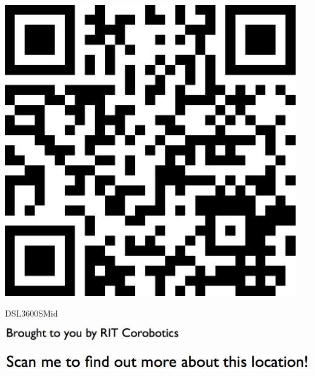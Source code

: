 \documentclass[letterpaper]{article}
\begin{document}
 \begingroup 
 \centerline{\includegraphics[scale=1,width=5in,height=5in]{DSL3600SMid.png}} 
 \endgroup 
 \vspace*{\fill} 

 \hfill{\small DSL3600SMid} 

  \vspace{0.7in} 
 
 \centerline{\includegraphics[scale=1,width=3in]{text-bottom.png}} 
 
 \pagebreak 
{} 
 \vspace*{\fill} 
 
  \centerline{\includegraphics[scale=1,width=6in]{text-top.png}} 
 
 \vspace{0.5in} 
 
\end{document}
